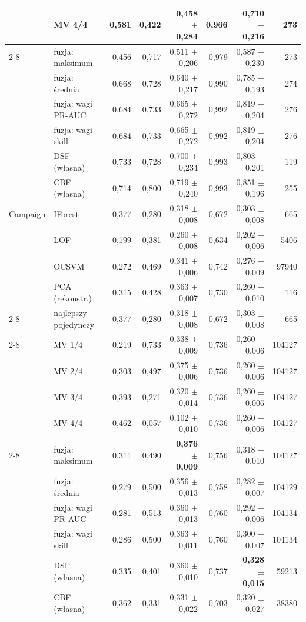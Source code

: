 \begin{longtable}{llrrrrrr}
 & MV 4/4 & 0,581 & 0,422 & 0,458 $\pm$ 0,284 & 0,966 & 0,710 $\pm$ 0,216 & 273 \\
\cmidrule(l){2-8}
 & fuzja: maksimum & 0,456 & 0,717 & 0,511 $\pm$ 0,206 & 0,979 & 0,587 $\pm$ 0,230 & 273 \\
 & fuzja: średnia & 0,668 & 0,728 & 0,640 $\pm$ 0,217 & 0,990 & 0,785 $\pm$ 0,193 & 274 \\
 & fuzja: wagi PR-AUC & 0,684 & 0,733 & 0,665 $\pm$ 0,272 & 0,992 & 0,819 $\pm$ 0,204 & 276 \\
 & fuzja: wagi skill & 0,684 & 0,733 & 0,665 $\pm$ 0,272 & 0,992 & 0,819 $\pm$ 0,204 & 276 \\
 & DSF (własna) & 0,733 & 0,728 & 0,700 $\pm$ 0,234 & 0,993 & 0,803 $\pm$ 0,201 & 119 \\
 & CBF (własna) & 0,714 & 0,800 & 0,719 $\pm$ 0,240 & 0,993 & 0,851 $\pm$ 0,196 & 255 \\
\midrule
Campaign & IForest & 0,377 & 0,280 & 0,318 $\pm$ 0,008 & 0,672 & 0,303 $\pm$ 0,008 & 665 \\
 & LOF & 0,199 & 0,381 & 0,260 $\pm$ 0,008 & 0,634 & 0,202 $\pm$ 0,006 & 5406 \\
 & OCSVM & 0,272 & 0,469 & 0,341 $\pm$ 0,006 & 0,742 & 0,276 $\pm$ 0,009 & 97940 \\
 & PCA (rekonstr.) & 0,315 & 0,428 & 0,363 $\pm$ 0,007 & 0,730 & 0,260 $\pm$ 0,010 & 116 \\
\cmidrule(l){2-8}
 & najlepszy pojedynczy & 0,377 & 0,280 & 0,318 $\pm$ 0,008 & 0,672 & 0,303 $\pm$ 0,008 & 665 \\
\cmidrule(l){2-8}
 & MV 1/4 & 0,219 & 0,733 & 0,338 $\pm$ 0,009 & 0,736 & 0,260 $\pm$ 0,006 & 104127 \\
 & MV 2/4 & 0,303 & 0,497 & 0,375 $\pm$ 0,006 & 0,736 & 0,260 $\pm$ 0,006 & 104127 \\
 & MV 3/4 & 0,393 & 0,271 & 0,320 $\pm$ 0,014 & 0,736 & 0,260 $\pm$ 0,006 & 104127 \\
 & MV 4/4 & 0,462 & 0,057 & 0,102 $\pm$ 0,010 & 0,736 & 0,260 $\pm$ 0,006 & 104127 \\
\cmidrule(l){2-8}
 & fuzja: maksimum & 0,311 & 0,490 & \textbf{0,376 $\pm$ 0,009} & 0,756 & 0,318 $\pm$ 0,010 & 104127 \\
 & fuzja: średnia & 0,279 & 0,500 & 0,356 $\pm$ 0,013 & 0,758 & 0,282 $\pm$ 0,007 & 104129 \\
 & fuzja: wagi PR-AUC & 0,281 & 0,513 & 0,360 $\pm$ 0,013 & 0,760 & 0,292 $\pm$ 0,006 & 104134 \\
 & fuzja: wagi skill & 0,286 & 0,500 & 0,363 $\pm$ 0,011 & 0,760 & 0,300 $\pm$ 0,007 & 104134 \\
 & DSF (własna) & 0,335 & 0,401 & 0,360 $\pm$ 0,010 & 0,737 & \textbf{0,328 $\pm$ 0,015} & 59213 \\
 & CBF (własna) & 0,362 & 0,331 & 0,331 $\pm$ 0,022 & 0,703 & 0,320 $\pm$ 0,027 & 38380 \\
\bottomrule
\end{longtable}
